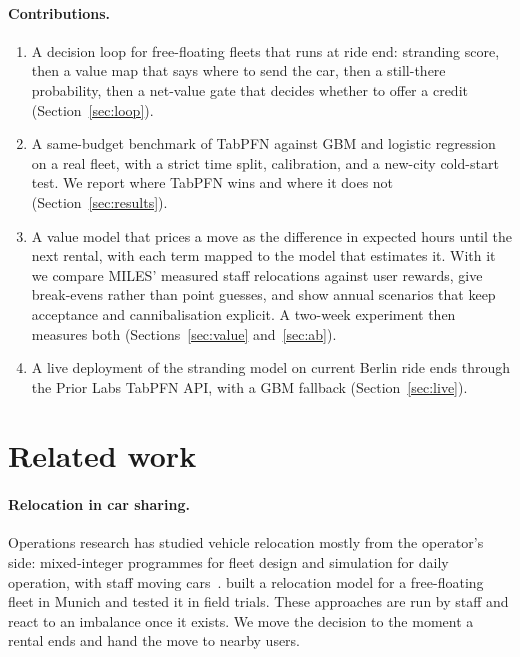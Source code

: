 \documentclass[11pt,a4paper]{article}
\begin{document}
\paragraph{Contributions.}
\begin{enumerate}
\item A decision loop for free-floating fleets that runs at ride end: stranding score, then a value map that says where to send the car, then a still-there probability, then a net-value gate that decides whether to offer a credit (Section~\ref{sec:loop}).
\item A same-budget benchmark of TabPFN against GBM and logistic regression on a real fleet, with a strict time split, calibration, and a new-city cold-start test. We report where TabPFN wins and where it does not (Section~\ref{sec:results}).
\item A value model that prices a move as the difference in expected hours until the next rental, with each term mapped to the model that estimates it. With it we compare MILES' measured staff relocations against user rewards, give break-evens rather than point guesses, and show annual scenarios that keep acceptance and cannibalisation explicit. A two-week experiment then measures both (Sections~\ref{sec:value} and~\ref{sec:ab}).
\item A live deployment of the stranding model on current Berlin ride ends through the Prior Labs TabPFN API, with a GBM fallback (Section~\ref{sec:live}).
\end{enumerate}

\section{Related work}

\paragraph{Relocation in car sharing.} Operations research has studied vehicle relocation mostly from the operator's side: mixed-integer programmes for fleet design and simulation for daily operation, with staff moving cars~\citep{illgen2019relocation}. \citet{weikl2015relocation} built a relocation model for a free-floating fleet in Munich and tested it in field trials. These approaches are run by staff and react to an imbalance once it exists. We move the decision to the moment a rental ends and hand the move to nearby users.
\end{document}
